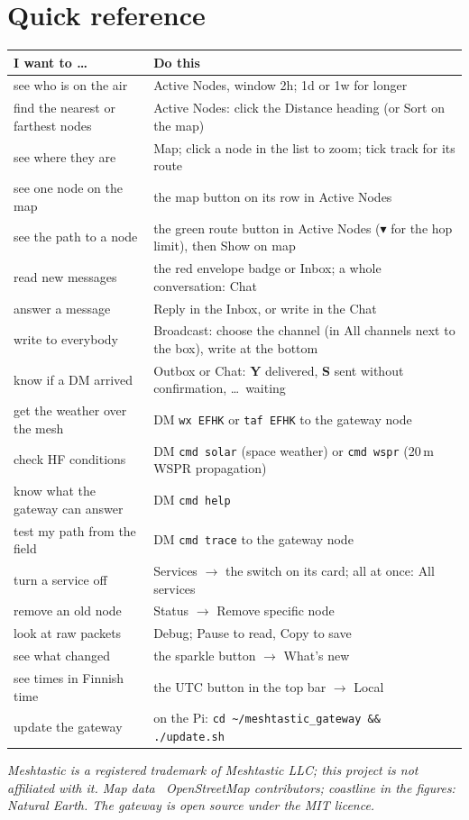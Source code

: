 \documentclass[10pt,a4paper]{article}
\newcommand{\ui}[1]{\textsf{\small #1}}            %
\newcommand{\cmd}[1]{\texttt{#1}}
\newcommand{\ackY}{\textcolor{ackY}{\textbf{Y}}}
\newcommand{\ackS}{\textcolor{ackS}{\textbf{S}}}
\begin{document}
\section{Quick reference}\label{sec:quick}
\begin{center}\small
\begin{tabularx}{\textwidth}{@{}lX@{}}
\toprule
I want to \dots & Do this \\
\midrule
see who is on the air & \ui{Active Nodes}, window \ui{2h}; \ui{1d} or \ui{1w} for longer \\
find the nearest or farthest nodes & \ui{Active Nodes}: click the \ui{Distance} heading (or \ui{Sort} on the map) \\
see where they are & \ui{Map}; click a node in the list to zoom; tick \ui{track} for its route \\
see one node on the map & the map button on its row in \ui{Active Nodes} \\
see the path to a node & the green route button in \ui{Active Nodes} (\ui{$\blacktriangledown$} for the hop limit), then \ui{Show on map} \\
read new messages & the red envelope badge or \ui{Inbox}; a whole conversation: \ui{Chat} \\
answer a message & \ui{Reply} in the Inbox, or write in the \ui{Chat} \\
write to everybody & \ui{Broadcast}: choose the channel (in \ui{All channels} next to the box), write at the bottom \\
know if a DM arrived & \ui{Outbox} or \ui{Chat}: \ackY{} delivered, \ackS{} sent without confirmation, \dots\ waiting \\
get the weather over the mesh & DM \cmd{wx EFHK} or \cmd{taf EFHK} to the gateway node \\
check HF conditions & DM \cmd{cmd solar} (space weather) or \cmd{cmd wspr} (20\,m WSPR propagation) \\
know what the gateway can answer & DM \cmd{cmd help} \\
test my path from the field & DM \cmd{cmd trace} to the gateway node \\
turn a service off & \ui{Services} $\rightarrow$ the switch on its card; all at once: \ui{All services} \\
remove an old node & \ui{Status} $\rightarrow$ \ui{Remove specific node} \\
look at raw packets & \ui{Debug}; \ui{Pause} to read, \ui{Copy} to save \\
see what changed & the sparkle button $\rightarrow$ \ui{What's new} \\
see times in Finnish time & the \ui{UTC} button in the top bar $\rightarrow$ \ui{Local} \\
update the gateway & on the Pi: \cmd{cd \textasciitilde/meshtastic\_gateway \&\& ./update.sh} \\
\bottomrule
\end{tabularx}
\end{center}

\vfill
{\small\itshape Meshtastic is a registered trademark of Meshtastic LLC; this project is not affiliated with it. Map data \textcopyright\ OpenStreetMap contributors; coastline in the figures: Natural Earth. The gateway is open source under the MIT licence.}
\end{document}
